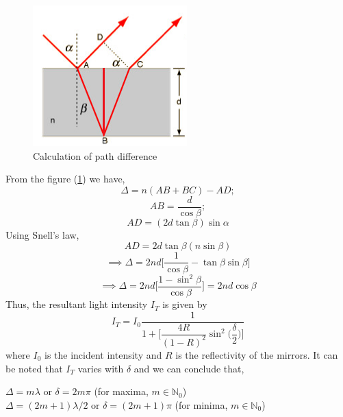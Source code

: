 \documentclass{article}
\begin{document}
\begin{figure}[h!]
    \centering
    \includegraphics[scale = 0.8]{Figures/calc of path diff.png}
    \caption{Calculation of path difference}
    \label{fig:pathdiff}
\end{figure}
\noindent
From the figure (\ref{fig:pathdiff}) we have,
\begin{equation}
    \Delta = n (AB + BC) - AD;
\end{equation}
\begin{equation}
    AB = \dfrac{d}{\cos \beta};
\end{equation}
\begin{equation}
    AD = (2 d \tan \beta) \sin \alpha
\end{equation}
\noindent
Using Snell's law, 
\begin{equation}
    AD = 2d \tan \beta (n \sin \beta)
\end{equation}
\begin{equation}
    \implies \Delta = 2 n d \Bigg[\dfrac{1}{\cos \beta} - \tan \beta \sin \beta \Bigg]
\end{equation}
\begin{equation}
    \implies \Delta = 2 n d \Bigg[\dfrac{1 - \sin^2 \beta}{\cos \beta} \Bigg] = 2 n d \cos \beta
\end{equation}
\noindent
Thus, the resultant light intensity $I_T$ is given by
\begin{equation}
    I_T = I_0 \dfrac{1}{1 + \Bigg[ \dfrac{4R}{(1 - R)^2} \sin^2 \bigg(\dfrac{\delta}{2}\bigg) \Bigg]}
\end{equation}
\noindent
where $I_0$ is the incident intensity and $R$ is the reflectivity of the mirrors. It can be noted that $I_T$ varies with $\delta$ and we can conclude that,
\begin{center}
    $\Delta = m \lambda$ or $\delta = 2 m \pi$ \hspace{1cm} (for maxima, $m \in \mathbb{N}_0$)\\
    $\Delta = (2 m + 1) \lambda / 2$ or $\delta = (2 m + 1) \pi$ \hspace{0.3cm} (for minima, $m \in \mathbb{N}_0$)
\end{center}
\end{document}
